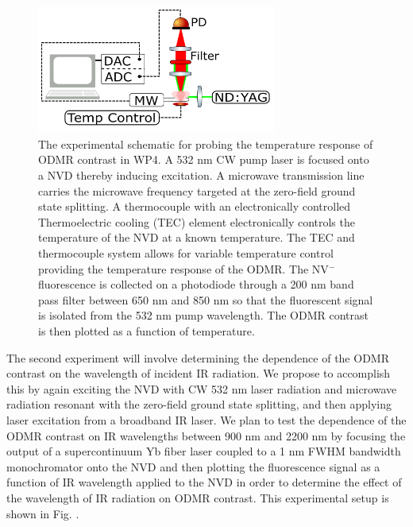 \documentclass[11pt]{article}
\begin{document}
\begin{figure}
\centering
\includegraphics[width=0.7\textwidth]{Figures/WP4TempSchematic.png}
\caption{The experimental schematic for probing the temperature response of ODMR contrast in WP4. A 532 nm CW pump laser is focused onto a NVD thereby inducing excitation. A microwave transmission line carries the microwave frequency targeted at the zero-field ground state splitting. A thermocouple with an electronically controlled Thermoelectric cooling (TEC) element electronically controls the temperature of the NVD at a known temperature. The TEC and thermocouple system allows for variable temperature control providing the temperature response of the ODMR. The NV$^-$ fluorescence is collected on a photodiode through a 200 nm band pass filter between 650 nm and 850 nm so that the fluorescent signal is isolated from the 532 nm pump wavelength. The ODMR contrast is then plotted as a function of temperature.}
\label{WP4TempSchematic}
\end{figure}

The second experiment will involve determining the dependence of the ODMR contrast on the wavelength of incident
IR radiation.  We propose to accomplish this by again exciting the NVD with CW 532 nm laser radiation and
microwave radiation resonant with the zero-field ground state splitting, and then applying laser excitation from
a broadband IR laser.  We plan to test the dependence of the ODMR contrast on IR wavelengths between 900 nm and
2200 nm by focusing the output of a supercontinuum Yb fiber laser coupled to a 1 nm FWHM bandwidth monochromator
onto the NVD and then plotting the fluorescence signal as a function of IR wavelength applied to the NVD in 
order to determine the effect of the wavelength of IR radiation on ODMR contrast. This experimental setup is 
shown in Fig. \label{WP4IRSchematic}.
\end{document}
